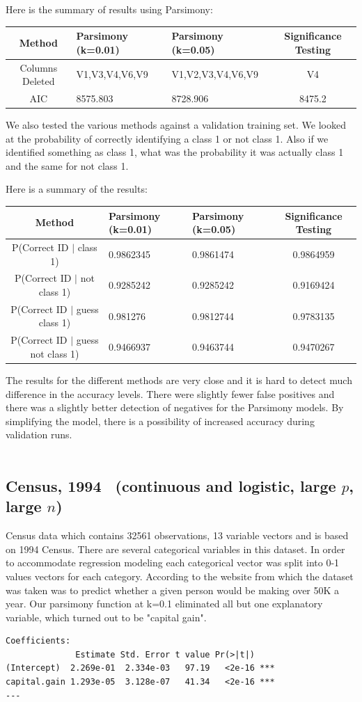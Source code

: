 \documentclass[letter]{article}
\begin{document}
Here is the summary of results using Parsimony:

\begin{tabular}{ | c | p{3cm} | p{3.3cm} | c  |}
\hline
Method&Parsimony (k=0.01) & Parsimony (k=0.05) & Significance Testing \\
\hline
Columns Deleted& V1,V3,V4,V6,V9 & V1,V2,V3,V4,V6,V9 & V4 \\
\hline
AIC & 8575.803 & 8728.906 & 8475.2 \\
\hline
\end{tabular}

We also tested the various methods against a validation training set. We looked at the probability of correctly identifying a class 1 or not class 1. Also if we identified something as class 1, what was the probability it was actually class 1 and the same for not class 1.

Here is a summary of the results:

\begin{tabular}{ | c | p{3cm} | p{3.3cm} | c  |}
\hline
Method&Parsimony (k=0.01) & Parsimony (k=0.05) & Significance Testing \\
\hline
P(Correct ID $|$ class 1) & 0.9862345 & 0.9861474 & 0.9864959 \\
\hline
P(Correct ID $|$ not class 1) & 0.9285242 & 0.9285242 & 0.9169424 \\
\hline
P(Correct ID $|$ guess class 1) & 0.981276 & 0.9812744 & 0.9783135 \\
\hline
P(Correct ID $|$ guess not class 1) & 0.9466937 & 0.9463744 & 0.9470267  \\
\hline
\end{tabular}

The results for the different methods are very close and it is hard to detect much difference in the accuracy levels. There were slightly fewer false positives and there was a slightly better detection of negatives for the Parsimony models. By simplifying the model, there is a possibility of increased accuracy during validation runs.
\\
\\


\subsection*{Census, 1994~\cite{census} (continuous and logistic, large $p$, large $n$)}
Census data which contains 32561 observations, 13 variable vectors and is based on 1994 Census. There are several categorical variables in this dataset. In order to accommodate regression modeling each categorical vector was split into 0-1 values vectors for each category. According to the website from which the dataset was taken was to predict whether a given person would be making over 50K a year.  Our parsimony function at k=0.1 eliminated all but one explanatory variable, which turned out to be "capital gain". 
\begin{verbatim}
Coefficients:
              Estimate Std. Error t value Pr(>|t|)    
(Intercept)  2.269e-01  2.334e-03   97.19   <2e-16 ***
capital.gain 1.293e-05  3.128e-07   41.34   <2e-16 ***
---

\end{verbatim}
\end{document}
